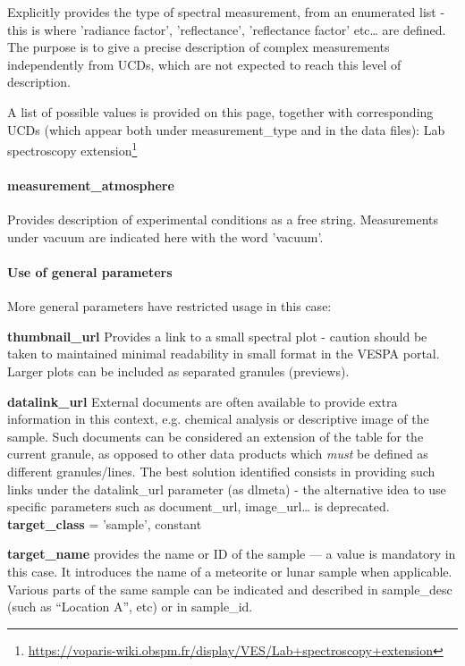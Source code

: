 \documentclass[11pt,a4paper]{ivoa}
\begin{document}
Explicitly provides the type of spectral measurement, from an enumerated list - this is where 'radiance factor', 'reflectance', 'reflectance factor' etc… are defined. The purpose is to give a precise description of complex measurements independently from UCDs, which are not expected to reach this level of description.

A list of possible values is provided on this page, together with corresponding UCDs (which appear both under measurement\_type and in the data files): Lab spectroscopy extension\footnote{\url{https://voparis-wiki.obspm.fr/display/VES/Lab+spectroscopy+extension}}

\paragraph{measurement\_atmosphere}

Provides description of experimental conditions as a free string. Measurements under vacuum are indicated here with the word 'vacuum'.

\paragraph{Use of general parameters}

More general parameters have restricted usage in this case:

\textbf{thumbnail\_url }Provides a link to a small spectral plot - caution should be taken to maintained minimal readability in small format in the VESPA portal. Larger plots can be included as separated granules (previews).

\textbf{datalink\_url} External documents are often available to provide extra information in this context, e.g. chemical analysis or descriptive image of the sample. Such documents can be considered an extension of the table for the current granule, as opposed to other data products which \emph{must} be defined as different granules/lines. The best solution identified consists in providing such links under the datalink\_url parameter (as dlmeta)  - the alternative idea to use specific parameters such as document\_url, image\_url… is deprecated.\\

\textbf{target\_class }= 'sample', constant

\textbf{target\_name }provides the name or ID of the sample — a value is mandatory in this case. It introduces the name of a meteorite or lunar sample when applicable. Various parts of the same sample can be indicated and described in sample\_desc (such as ``Location A'', etc) or in sample\_id.
\end{document}
